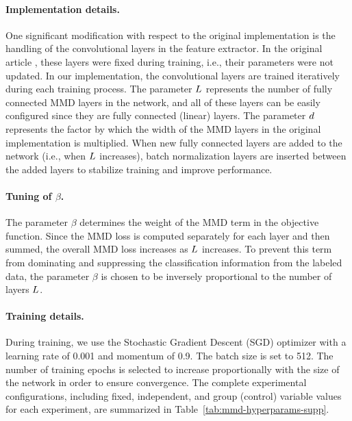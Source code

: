 \documentclass[review,supplement,onefignum,onetabnum]{siamonline250211}
\begin{document}
\paragraph{Implementation details.}
One significant modification with respect to the original implementation is the handling of the convolutional layers in the feature extractor. In the original article \cite{LongCWJ15}, these layers were fixed during training, i.e., their parameters were not updated. In our implementation, the convolutional layers are trained iteratively during each training process. The parameter $L$ represents the number of fully connected MMD layers in the network, and all of these layers can be easily configured since they are fully connected (linear) layers. The parameter ${d}$ represents the factor by which the width of the MMD layers in the original implementation \cite{mmd_code_pytorch} is multiplied. When new fully connected layers are added to the network (i.e., when $L$ increases), batch normalization layers are inserted between the added layers to stabilize training and improve performance.

\paragraph{Tuning of $\beta$.}
The parameter $\beta$ determines the weight of the MMD term in the objective function. Since the MMD loss is computed separately for each layer and then summed, the overall MMD loss increases as $L$ increases. To prevent this term from dominating and suppressing the classification information from the labeled data, the parameter $\beta$ is chosen to be inversely proportional to the number of layers $L$.

\paragraph{Training details.}
During training, we use the Stochastic Gradient Descent (SGD) optimizer with a learning rate of 0.001 and momentum of 0.9. The batch size is set to 512. The number of training epochs is selected to increase proportionally with the size of the network in order to ensure convergence. The complete experimental configurations, including fixed, independent, and group (control) variable values for each experiment, are summarized in Table~\ref{tab:mmd-hyperparams-supp}.
\end{document}

